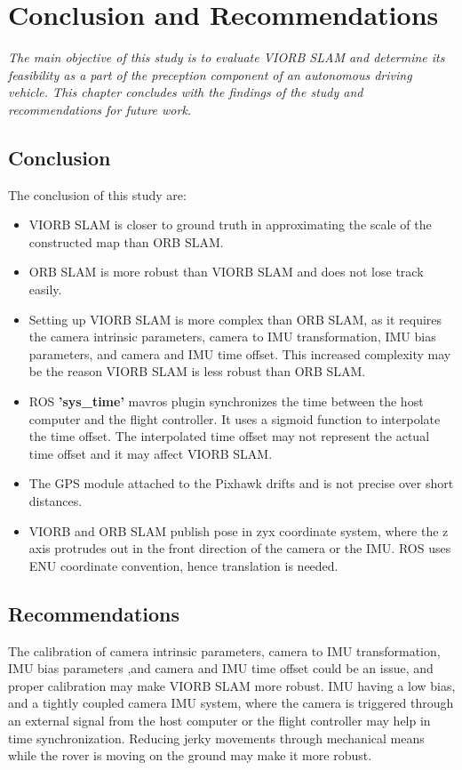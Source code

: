 \setlength{\footskip}{8mm}

\chapter{Conclusion and Recommendations}
\label{ch:conclusion}

\textit{The main objective of this study is to evaluate VIORB SLAM and determine its feasibility as a part of the preception component of an autonomous driving vehicle. This chapter concludes with the findings of the study and recommendations for future work.}

\section{Conclusion}
The conclusion of this study are:
\begin{itemize}
	\item VIORB SLAM is closer to ground truth in approximating the scale of the constructed map than ORB SLAM.
	\item ORB SLAM is more robust than VIORB SLAM and does not lose track easily.
	\item Setting up VIORB SLAM is more complex than ORB SLAM, as it requires the camera intrinsic parameters, camera to IMU transformation, IMU bias parameters, and camera and IMU time offset. This increased complexity may be the reason VIORB SLAM is less robust than ORB SLAM.
	\item ROS \textbf{'sys\_time'} mavros plugin synchronizes the time between the host computer and the flight controller. It uses a sigmoid function to interpolate the time offset. The interpolated time offset may not represent the actual time offset and it may affect VIORB SLAM.
	\item The GPS module attached to the Pixhawk drifts and is not precise over short distances.
	\item VIORB and ORB SLAM publish pose in zyx coordinate system, where the z axis protrudes out in the front direction of the camera or the IMU. ROS uses ENU coordinate convention, hence translation is needed. 
\end{itemize}

\section{Recommendations}
The calibration of camera intrinsic parameters, camera to IMU transformation, IMU bias parameters ,and camera and IMU time offset could be an issue, and proper calibration may make VIORB SLAM more robust. IMU having a low bias, and a tightly coupled camera IMU system, where the camera is triggered through an external signal from the host computer or the flight controller may help in time synchronization. Reducing jerky movements through mechanical means while the rover is moving on the ground may make it more robust.
\FloatBarrier

